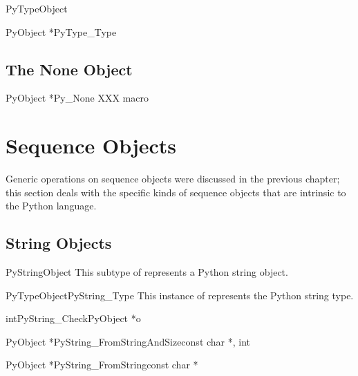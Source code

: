 \documentclass[twoside,openright]{report}
\begin{document}
\begin{ctypedesc}{PyTypeObject}

\end{ctypedesc}

\begin{cvardesc}{PyObject *}{PyType_Type}

\end{cvardesc}


\subsection{The None Object}

\begin{cvardesc}{PyObject *}{Py_None}
XXX macro
\end{cvardesc}


\section{Sequence Objects}

Generic operations on sequence objects were discussed in the previous 
chapter; this section deals with the specific kinds of sequence 
objects that are intrinsic to the Python language.


\subsection{String Objects}

\begin{ctypedesc}{PyStringObject}
This subtype of  represents a Python string object.
\end{ctypedesc}

\begin{cvardesc}{PyTypeObject}{PyString_Type}
This instance of  represents the Python string type.
\end{cvardesc}

\begin{cfuncdesc}{int}{PyString_Check}{PyObject *o}

\end{cfuncdesc}

\begin{cfuncdesc}{PyObject *}{PyString_FromStringAndSize}{const char *, int}

\end{cfuncdesc}

\begin{cfuncdesc}{PyObject *}{PyString_FromString}{const char *}

\end{cfuncdesc}
\end{document}
